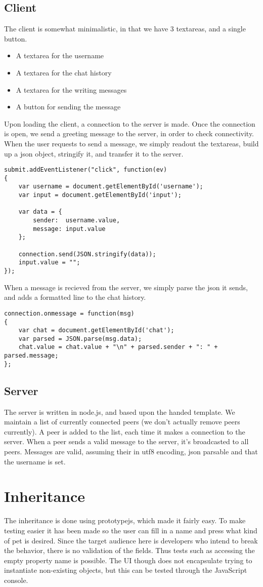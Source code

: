 \documentclass[a4paper,10pt]{article}
\begin{document}
\subsection*{Client}
The client is somewhat minimalistic, in that we have 3 textareas, and a single button.
\begin{itemize}
\item A textarea for the username
\item A textarea for the chat history
\item A textarea for the writing messages
\item A button for sending the message
\end{itemize}

Upon loading the client, a connection to the server is made.
Once the connection is open, we send a greeting message to the server, in order to check connectivity.
When the user requests to send a message, we simply readout the textareas,
build up a json object, stringify it, and transfer it to the server.
\begin{verbatim}
submit.addEventListener("click", function(ev)
{
    var username = document.getElementById('username');
    var input = document.getElementById('input');

    var data = {
        sender:  username.value,
        message: input.value
    };

    connection.send(JSON.stringify(data));
    input.value = "";
});
\end{verbatim}
When a message is recieved from the server, we simply parse the json it sends,
and adds a formatted line to the chat history.
\begin{verbatim}
connection.onmessage = function(msg)
{
    var chat = document.getElementById('chat');
    var parsed = JSON.parse(msg.data);
    chat.value = chat.value + "\n" + parsed.sender + ": " + parsed.message;
};
\end{verbatim}

\subsection*{Server}
The server is written in node.js, and based upon the handed template.
We maintain a list of currently connected peers (we don't actually remove peers currently).
A peer is added to the list, each time it makes a connection to the server.
When a peer sends a valid message to the server, it's broadcasted to all peers.
Messages are valid, assuming their in utf8 encoding, json parsable and that the username is set.

\section*{Inheritance}
The inheritance is done using prototypejs, which made it fairly easy.
To make testing easier it has been made so the user can fill in a name
and press what kind of pet is desired.  Since the target audience here
is developers who intend to break the behavior, there is no validation
of the fields.  Thus tests such as accessing the empty property name
is possible.  The UI though does not encapsulate trying to instantiate
non-existing objects, but this can be tested through the JavaScript
console.
\end{document}
